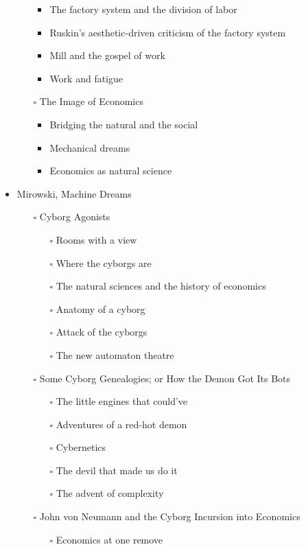 \documentclass[paper=B6,portrait,twoside=true,twocolumn=false,headinclude=true,footinclude=false,fontsize=12,BCOR=10mm,DIV=calc,pagesize=auto,titlepage=firstiscover,mpinclude=false,headings=normal,headings=twolinechapter,open=right,toc=graduated,chapterprefix=false,numbers=endperiod,parskip=half+]{scrbook}
\theoremstyle{definition}
\begin{document}
\begin{itemize}
\begin{itemize}
\begin{itemize}
\item The factory system and the division of labor
\item Ruskin's aesthetic-driven criticism of the factory system
\item Mill and the gospel of work
\item Work and fatigue
\end{itemize}
\item[{$\square$}] The Image of Economics
\begin{itemize}
\item Bridging the natural and the social
\item Mechanical dreams
\item Economics as natural science
\end{itemize}
\end{itemize}
\item\relax [0/8] Mirowski, Machine Dreams
\begin{itemize}
\item[{$\square$}] Cyborg Agonists
\begin{itemize}
\item[{$\square$}] Rooms with a view
\item[{$\square$}] Where the cyborgs are
\item[{$\square$}] The natural sciences and the history of economics
\item[{$\square$}] Anatomy of a cyborg
\item[{$\square$}] Attack of the cyborgs
\item[{$\square$}] The new automaton theatre
\end{itemize}
\item[{$\square$}] Some Cyborg Genealogies; or How the Demon Got Its Bots
\begin{itemize}
\item[{$\square$}] The little engines that could've
\item[{$\square$}] Adventures of a red-hot demon
\item[{$\square$}] Cybernetics
\item[{$\square$}] The devil that made us do it
\item[{$\square$}] The advent of complexity
\end{itemize}
\item[{$\square$}] John von Neumann and the Cyborg Incursion into Economics
\begin{itemize}
\item[{$\square$}] Economics at one remove

\end{itemize}
\end{itemize}
\end{itemize}
\end{document}
